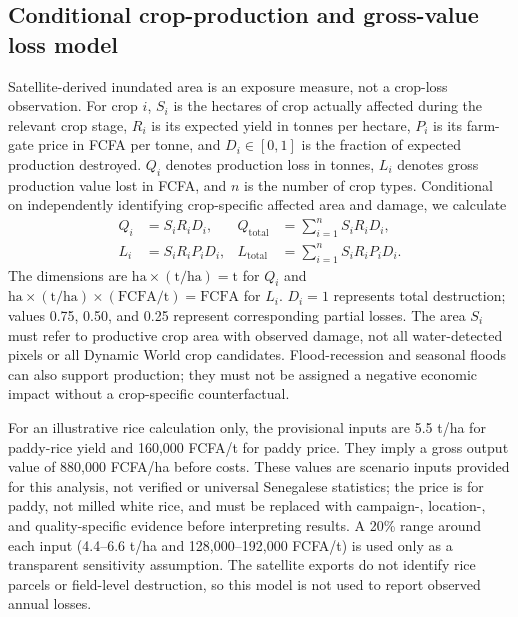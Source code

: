 \documentclass[pdflatex,sn-mathphys,Numbered]{sn-jnl}
\begin{document}
\subsection{Conditional crop-production and gross-value loss model}
Satellite-derived inundated area is an exposure measure, not a crop-loss observation. For crop $i$, $S_i$ is the hectares of crop actually affected during the relevant crop stage, $R_i$ is its expected yield in tonnes per hectare, $P_i$ is its farm-gate price in FCFA per tonne, and $D_i\in[0,1]$ is the fraction of expected production destroyed. $Q_i$ denotes production loss in tonnes, $L_i$ denotes gross production value lost in FCFA, and $n$ is the number of crop types. Conditional on independently identifying crop-specific affected area and damage, we calculate
\begin{align}
Q_i &= S_iR_iD_i, & Q_{\mathrm{total}} &= \sum_{i=1}^{n}S_iR_iD_i,\\
L_i &= S_iR_iP_iD_i, & L_{\mathrm{total}} &= \sum_{i=1}^{n}S_iR_iP_iD_i.
\end{align}
The dimensions are $\mathrm{ha}\times(\mathrm{t}/\mathrm{ha})=\mathrm{t}$ for $Q_i$ and $\mathrm{ha}\times(\mathrm{t}/\mathrm{ha})\times(\mathrm{FCFA}/\mathrm{t})=\mathrm{FCFA}$ for $L_i$. $D_i=1$ represents total destruction; values 0.75, 0.50, and 0.25 represent corresponding partial losses. The area $S_i$ must refer to productive crop area with observed damage, not all water-detected pixels or all Dynamic World crop candidates. Flood-recession and seasonal floods can also support production; they must not be assigned a negative economic impact without a crop-specific counterfactual.

For an illustrative rice calculation only, the provisional inputs are 5.5 t/ha for paddy-rice yield and 160,000 FCFA/t for paddy price. They imply a gross output value of 880,000 FCFA/ha before costs. These values are scenario inputs provided for this analysis, not verified or universal Senegalese statistics; the price is for paddy, not milled white rice, and must be replaced with campaign-, location-, and quality-specific evidence before interpreting results. A 20\% range around each input (4.4--6.6 t/ha and 128,000--192,000 FCFA/t) is used only as a transparent sensitivity assumption. The satellite exports do not identify rice parcels or field-level destruction, so this model is not used to report observed annual losses.
\end{document}
